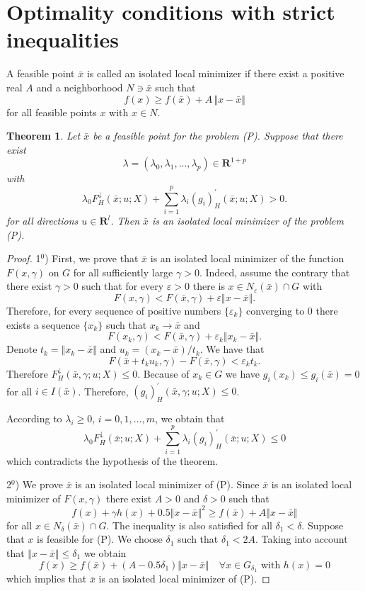 \documentclass[12pt]{article}
\newtheorem{theorem}{Theorem}[section]
\def\R{\mathbf R}
\def\E{\mathbf R^l}
\def\ld#1{#1^{\downarrow}_{H}}
\def\d#1{#1^{\prime}_{H}}
\newcommand{\norm}[1]{\Vert#1\Vert}
\begin{document}
\section{Optimality conditions with strict inequalities}
\label{s4}
A feasible point $\bar x$ is called an isolated local minimizer
if there exist a positive real $A$ and a neighborhood $N\ni\bar x$ such that
\[
f(x)\ge f(\bar x)+ A\,\norm{x-\bar x}
\]
for all feasible points $x$ with $x\in N$.

\begin{theorem}
Let $\bar x$  be a feasible point for the problem (P). Suppose that there exist
\[
\lambda=(\lambda_0,\lambda_1,...,\lambda_p)\in\R^{1+p}
\]
with
\begin{equation}\label{strictlagrange}
\lambda_0\ld F(\bar x;u;X)+\sum_{i=1}^p\lambda_i\d {(g_i)} (\bar x;u;X)>0.
\end{equation}
for all directions $u\in\E$. Then $\bar x$ is an isolated local minimizer
of the problem {\rm (P)}.
\end{theorem}
\begin{proof}
1$^0$) First, we prove that $\bar x$ is an isolated local minimizer of the function $F(x,\gamma)$ on $G$
for all sufficiently large $\gamma>0$. Indeed, assume the contrary that there exist
$\gamma>0$ such that for every $\varepsilon>0$ there is
$x\in N_\varepsilon(\bar x)\cap G$ with
\[
F(x,\gamma)<F(\bar x,\gamma)+\varepsilon\norm{x-\bar x}.
\] 
Therefore,
for every sequence of positive numbers $\{\varepsilon_k\}$ converging to 0
there exists a sequence $\{x_k\}$ such that $x_k\to\bar x$ and
\[
F(x_k,\gamma)<F(\bar x,\gamma)+\varepsilon_k\norm{x_k-\bar x}.
\]
Denote $t_k=\norm{x_k-\bar x}$ and $u_k=(x_k-\bar x)/t_k$. We have that
\[
F(\bar x+t_k u_k,\gamma)-F(\bar x,\gamma)<\varepsilon_k t_k.
\]
Therefore $\ld F(\bar x,\gamma;u;X)\le 0$.
Because of $x_k\in G$ we have $g_i(x_k)\le g_i(\bar x)=0$ for all
$i\in I(\bar x)$. Therefore, $\d {(g_i)}(\bar x,\gamma;u;X)\le 0$.


According to $\lambda_i\ge 0$, $i=0,1,...,m$,  we obtain that
\[
\lambda_0\ld F(\bar x;u;X)+\sum_{i=1}^p\lambda_i\d {(g_i)} (\bar x;u;X)\le 0
\]
which contradicts the hypothesis of the theorem.


2$^0$) We prove $\bar x$ is an isolated local minimizer of (P).
Since $\bar x$ is an isolated local minimizer of   $F(x,\gamma)$ there exist
$A>0$ and $\delta>0$ such that
\[
f(x)+\gamma h(x)+0.5\norm{x-\bar x}^2\ge f(\bar x)+A\norm{x-\bar x}
\]
for all $x\in N_\delta(\bar x)\cap G$. The inequality is also satisfied for all  $\delta_1<\delta$.   Suppose that $x$ is feasible for (P).
We choose $\delta_1$ such that $\delta_1<2A$. Taking into account that
$\norm{x-\bar x}\le\delta_1$ we obtain
\[
f(x)\ge f(\bar x)+(A-0.5\delta_1)\norm{x-\bar x}\quad\forall x\in G_{\delta_1}
\textrm{ with } h(x)=0
\]
which implies that $\bar x$ is an isolated local minimizer of (P).
\end{proof}
\end{document}
